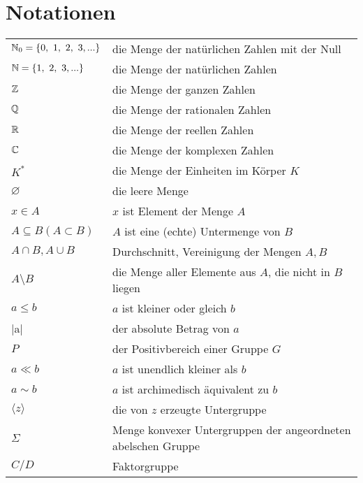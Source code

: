 \clearpage
\thispagestyle{empty}

\chapter{Notationen}

\begin{center}
\begin{tabular}{ll}
  $\mathbb{N}_0 = \lbrace 0,~1,~2,~3,...\rbrace$ & die Menge der natürlichen Zahlen mit der Null	\\
  $\mathbb{N} = \lbrace 1,~2,~3,...\rbrace$ & die Menge der natürlichen Zahlen \\
  $\mathbb{Z}$ & die Menge der ganzen Zahlen\\
  $\mathbb{Q}$ & die Menge der rationalen Zahlen\\
  $\mathbb{R}$ & die Menge der reellen Zahlen\\
  $\mathbb{C}$ & die Menge der komplexen Zahlen\\
  $K^*$& die Menge der Einheiten im Körper $K$\\
  $\varnothing$ & die leere Menge \\
  $x \in A$ & $x$ ist Element der Menge $A$\\
  $A\subseteq B (A \subset B)$& $A$ ist eine (echte) Untermenge von $B$ \\
  $A \cap B, A \cup B$ & Durchschnitt, Vereinigung der Mengen $A, B$\\
  $A \setminus B$ & die Menge aller Elemente aus $A$, die nicht in $B$ liegen \\
  $ a \leq b$ & $a$ ist kleiner oder gleich $b$\\
  |a| & der absolute Betrag von $a$\\
  $P$ & der Positivbereich einer Gruppe $G$ \\
  $a \ll b$ & $a$ ist unendlich kleiner als $b$\\
  $a \sim b$ & $a$ ist archimedisch äquivalent zu $b$\\
  $\langle z \rangle$ & die von $z$ erzeugte Untergruppe\\
  $\Sigma$ & Menge konvexer Untergruppen der angeordneten abelschen Gruppe\\
  $C/D$ & Faktorgruppe\\
 \end{tabular}
\end{center}